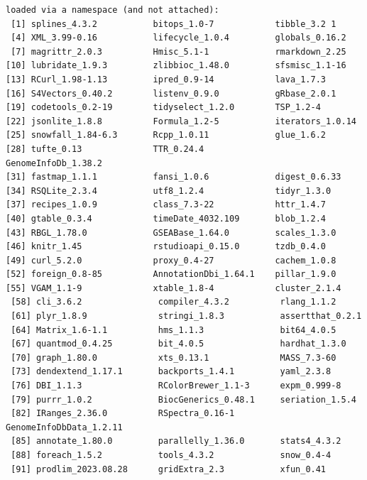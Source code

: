 \documentclass{amsart}
\begin{document}
\begin{verbatim}
loaded via a namespace (and not attached):
 [1] splines_4.3.2           bitops_1.0-7            tibble_3.2 1                              
 [4] XML_3.99-0.16           lifecycle_1.0.4         globals_0.16.2                            
 [7] magrittr_2.0.3          Hmisc_5.1-1             rmarkdown_2.25                        
[10] lubridate_1.9.3         zlibbioc_1.48.0         sfsmisc_1.1-16                                 
[13] RCurl_1.98-1.13         ipred_0.9-14            lava_1.7.3                               
[16] S4Vectors_0.40.2        listenv_0.9.0           gRbase_2.0.1                                
[19] codetools_0.2-19        tidyselect_1.2.0        TSP_1.2-4                                             
[22] jsonlite_1.8.8          Formula_1.2-5           iterators_1.0.14                     
[25] snowfall_1.84-6.3       Rcpp_1.0.11             glue_1.6.2                           
[28] tufte_0.13              TTR_0.24.4              GenomeInfoDb_1.38.2         
[31] fastmap_1.1.1           fansi_1.0.6             digest_0.6.33                  
[34] RSQLite_2.3.4           utf8_1.2.4              tidyr_1.3.0                  
[37] recipes_1.0.9           class_7.3-22            httr_1.4.7                      
[40] gtable_0.3.4            timeDate_4032.109       blob_1.2.4                     
[43] RBGL_1.78.0             GSEABase_1.64.0         scales_1.3.0                        
[46] knitr_1.45              rstudioapi_0.15.0       tzdb_0.4.0                         
[49] curl_5.2.0              proxy_0.4-27            cachem_1.0.8                     
[52] foreign_0.8-85          AnnotationDbi_1.64.1    pillar_1.9.0                        
[55] VGAM_1.1-9              xtable_1.8-4            cluster_2.1.4                       
 [58] cli_3.6.2               compiler_4.3.2          rlang_1.1.2                     
 [61] plyr_1.8.9              stringi_1.8.3           assertthat_0.2.1               
 [64] Matrix_1.6-1.1          hms_1.1.3               bit64_4.0.5                      
 [67] quantmod_0.4.25         bit_4.0.5               hardhat_1.3.0 
 [70] graph_1.80.0            xts_0.13.1              MASS_7.3-60 
 [73] dendextend_1.17.1       backports_1.4.1         yaml_2.3.8   
 [76] DBI_1.1.3               RColorBrewer_1.1-3      expm_0.999-8   
 [79] purrr_1.0.2             BiocGenerics_0.48.1     seriation_1.5.4 
 [82] IRanges_2.36.0          RSpectra_0.16-1         GenomeInfoDbData_1.2.11
 [85] annotate_1.80.0         parallelly_1.36.0       stats4_4.3.2 
 [88] foreach_1.5.2           tools_4.3.2             snow_0.4-4
 [91] prodlim_2023.08.28      gridExtra_2.3           xfun_0.41 

\end{verbatim}
\end{document}
